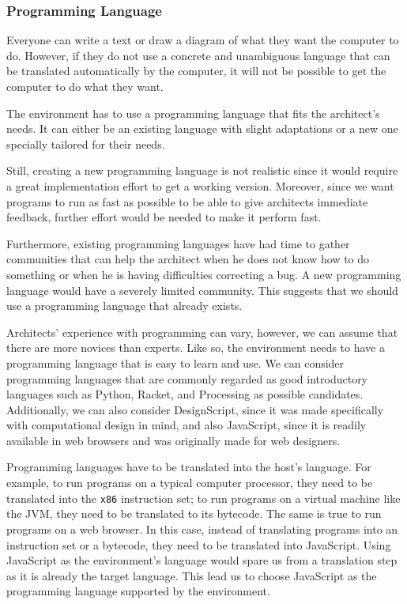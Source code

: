 \subsubsection{Programming Language}
Everyone can write a text or draw a diagram of what they want the computer to do.
However, if they do not use a concrete and unambiguous language that can be translated automatically by the computer, it will not be possible to get the computer to do what they want.

The environment has to use a programming language that fits the architect's needs.
It can either be an existing language with slight adaptations or a new one specially tailored for their needs.

Still, creating a new programming language is not realistic since it would require a great implementation effort to get a working version.
Moreover, since we want programs to run as fast as possible to be able to give architects immediate feedback, further effort would be needed to make it perform fast.

Furthermore, existing programming languages have had time to gather communities that can help the architect when he does not know how to do something or when he is having difficulties correcting a bug.
A new programming language would have a severely limited community.
This suggests that we should use a programming language that already exists.

Architects' experience with programming can vary, however, we can assume that there are more novices than experts.
Like so, the environment needs to have a programming language that is easy to learn and use.
We can consider programming languages that are commonly regarded as good introductory languages such as Python, Racket, and Processing as possible candidates.
Additionally, we can also consider DesignScript, since it was made specifically with computational design in mind\cite{aish2013designscript}, and also JavaScript, since it is readily available in web browsers and was originally made for web designers.

Programming languages have to be translated into the host's language.
For example, to run programs on a typical computer processor, they need to be translated into the {\tt x86} instruction set; to run programs on a virtual machine like the JVM, they need to be translated to its bytecode.
The same is true to run programs on a web browser.
In this case, instead of translating programs into an instruction set or a bytecode, they need to be translated into JavaScript.
Using JavaScript as the environment's language would spare us from a translation step as it is already the target language.
This lead us to choose JavaScript as the programming language supported by the environment.

